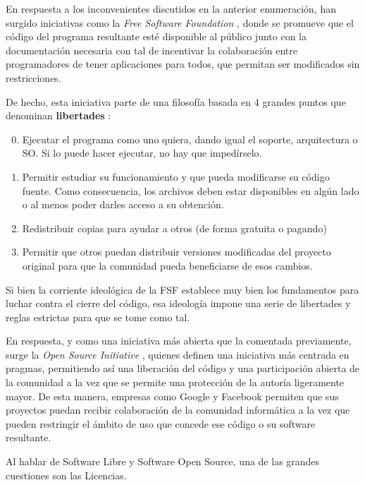 En respuesta a los inconvenientes discutidos en la anterior enumeración, han surgido iniciativas como la \textit{Free Software Foundation} \cite{fsf-about}, donde se promueve que el código del programa resultante esté disponible al público junto con la documentación necesaria con tal de incentivar la colaboración entre programadores de tener aplicaciones para todos, que permitan ser modificados sin restricciones.

De hecho, esta iniciativa parte de una filosofía basada en 4 grandes puntos que denominan \textbf{libertades} \cite{fsf-philosophy}:

\begin{enumerate}
	\setcounter{enumi}{-1}
	\item Ejecutar el programa como uno quiera, dando igual el soporte, arquitectura o SO. Si lo puede hacer ejecutar, no hay que impedírselo.
	\item Permitir estudiar su funcionamiento y que pueda modificarse su código fuente. Como consecuencia, los archivos deben estar disponibles en algún lado o al menos poder darles acceso a su obtención.
	\item Redistribuir copias para ayudar a otros (de forma gratuita o pagando)
	\item Permitir que otros puedan distribuir versiones modificadas del proyecto original para que la comunidad pueda beneficiarse de esos cambios.
\end{enumerate}

Si bien la corriente ideológica de la FSF establece muy bien los fundamentos para luchar contra el cierre del código, esa ideología impone una serie de libertades y reglas estrictas para que se tome como tal. 

En respuesta, y como una iniciativa más abierta que la comentada previamente, surge la \textit{Open Source Initiative} \cite{osi-about}, quienes definen una iniciativa más centrada en pragmas, permitiendo así una liberación del código y una participación abierta de la comunidad a la vez que se permite una protección de la autoría ligeramente mayor. De esta manera, empresas como Google y Facebook permiten que sus proyectos puedan recibir colaboración de la comunidad informática a la vez que pueden restringir el ámbito de uso que concede ese código o su software resultante.

Al hablar de Software Libre y Software Open Source, una de las grandes cuestiones son las Licencias. 

